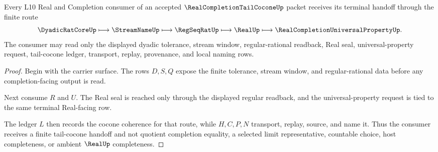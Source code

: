 \begin{theorem}
\label{thm:real-completion-tail-cocone-vision-route}
Every L10 Real and Completion consumer of an accepted $\RealCompletionTailCoconeUp$ packet receives its terminal handoff through the finite route
$$
\DyadicRatCoreUp
\longmapsto
\StreamNameUp
\longmapsto
\RegSeqRatUp
\longmapsto
\RealUp
\longmapsto
\RealCompletionUniversalPropertyUp .
$$
The consumer may read only the displayed dyadic tolerance, stream window, regular-rational readback, Real seal, universal-property request, tail-cocone ledger, transport, replay, provenance, and local naming rows.
\end{theorem}
\begin{proof}
Begin with the carrier surface. The rows $D,S,Q$ expose the finite tolerance, stream window, and regular-rational data before any completion-facing output is read.

Next consume $R$ and $U$. The Real seal is reached only through the displayed regular readback, and the universal-property request is tied to the same terminal Real-facing row.

The ledger $L$ then records the cocone coherence for that route, while $H,C,P,N$ transport, replay, source, and name it. Thus the consumer receives a finite tail-cocone handoff and not quotient completion equality, a selected limit representative, countable choice, host completeness, or ambient $\RealUp$ completeness.
\end{proof}





